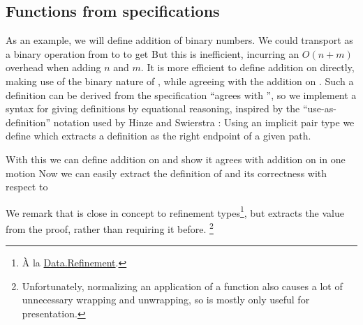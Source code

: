 \subsection{Functions from specifications}\label{ssec:useas}
As an example, we will define addition of binary numbers. We could transport \AgdaFunction{\_+\_} as a binary operation
from \bN to \bL to get
But this is inefficient, incurring an $O(n + m)$ overhead when adding $n$ and $m$. It is more efficient to define addition on \bL{} directly, making use of the binary nature of \bL{}, while agreeing with the addition on \bN{}. Such a definition can be derived from the specification ``agrees with \AgdaFunction{\_+\_}'', so we implement a syntax for giving definitions by equational reasoning, inspired by the ``use-as-definition'' notation used by Hinze and Swierstra \cite{calcdata}: Using an implicit pair type
we define
which extracts a definition as the right endpoint of a given path.

With this we can define addition on \bL{} and show it agrees with addition on \bN{} in one motion
Now we can easily extract the definition of  and its correctness with respect to \AgdaFunction{\_+\_} 

We remark that  is close in concept to refinement types\footnote{À la \href{https://agda.github.io/agda-stdlib/Data.Refinement.html}{Data.Refinement}.}, but extracts the value from the proof, rather than requiring it before. \footnote{Unfortunately, normalizing an application of a  function also causes a lot of unnecessary wrapping and unwrapping, so  is mostly only useful for presentation.} %


